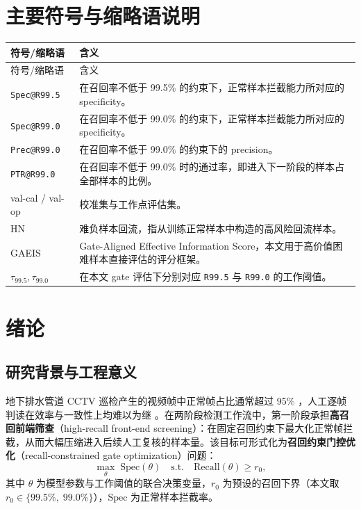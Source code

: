 \documentclass[UTF8,openany,12pt]{ctexbook}
\newcommand{\formalmetric}[1]{\texttt{#1}}
\begin{document}
\chapter*{主要符号与缩略语说明}
\begin{longtable}{p{3.2cm}p{10.4cm}}
\toprule
符号/缩略语 & 含义 \\
\midrule
\endfirsthead
\toprule
符号/缩略语 & 含义 \\
\midrule
\endhead
\formalmetric{Spec@R99.5} & 在召回率不低于 99.5\% 的约束下，正常样本拦截能力所对应的 specificity。 \\
\formalmetric{Spec@R99.0} & 在召回率不低于 99.0\% 的约束下，正常样本拦截能力所对应的 specificity。 \\
\formalmetric{Prec@R99.0} & 在召回率不低于 99.0\% 的约束下的 precision。 \\
\formalmetric{PTR@R99.0} & 在召回率不低于 99.0\% 时的通过率，即进入下一阶段的样本占全部样本的比例。 \\
val-cal / val-op & 校准集与工作点评估集。 \\
HN & 难负样本回流，指从训练正常样本中构造的高风险回流样本。 \\
GAEIS & Gate-Aligned Effective Information Score，本文用于高价值困难样本直接评估的评分框架。 \\
$\tau_{99.5}, \tau_{99.0}$ & 在本文 gate 评估下分别对应 \formalmetric{R99.5} 与 \formalmetric{R99.0} 的工作阈值。 \\
\bottomrule
\end{longtable}

\mainmatter

\chapter{绪论}

\section{研究背景与工程意义}
地下排水管道 CCTV 巡检产生的视频帧中正常帧占比通常超过 95\% \cite{haurum2020survey}，人工逐帧判读在效率与一致性上均难以为继 \cite{moradi2019review,cheng2018deep,ma2026stateoftheart}。在两阶段检测工作流中，第一阶段承担\textbf{高召回前端筛查}（high-recall front-end screening）：在固定召回约束下最大化正常帧拦截，从而大幅压缩进入后续人工复核的样本量。该目标可形式化为\textbf{召回约束门控优化}（recall-constrained gate optimization）问题：
\begin{equation}
\max_{\theta}\;\mathrm{Spec}(\theta) \quad \text{s.t.} \quad \mathrm{Recall}(\theta) \geq r_0,
\label{eq:gate-objective}
\end{equation}
其中 $\theta$ 为模型参数与工作阈值的联合决策变量，$r_0$ 为预设的召回下界（本文取 $r_0 \in \{99.5\%,\;99.0\%\}$），$\mathrm{Spec}$ 为正常样本拦截率。
\end{document}
